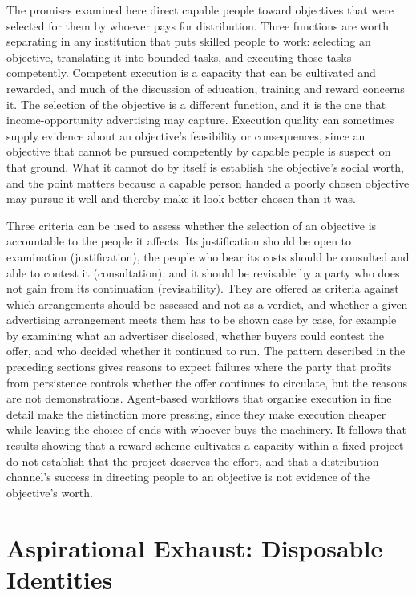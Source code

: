 \documentclass[12pt, a4paper]{article}
\begin{document}
The promises examined here direct capable people toward objectives that were selected for them by whoever pays for distribution. Three functions are worth separating in any institution that puts skilled people to work: selecting an objective, translating it into bounded tasks, and executing those tasks competently. Competent execution is a capacity that can be cultivated and rewarded, and much of the discussion of education, training and reward concerns it. The selection of the objective is a different function, and it is the one that income-opportunity advertising may capture. Execution quality can sometimes supply evidence about an objective's feasibility or consequences, since an objective that cannot be pursued competently by capable people is suspect on that ground. What it cannot do by itself is establish the objective's social worth, and the point matters because a capable person handed a poorly chosen objective may pursue it well and thereby make it look better chosen than it was.

Three criteria can be used to assess whether the selection of an objective is accountable to the people it affects. Its justification should be open to examination (justification), the people who bear its costs should be consulted and able to contest it (consultation), and it should be revisable by a party who does not gain from its continuation (revisability). They are offered as criteria against which arrangements should be assessed and not as a verdict, and whether a given advertising arrangement meets them has to be shown case by case, for example by examining what an advertiser disclosed, whether buyers could contest the offer, and who decided whether it continued to run. The pattern described in the preceding sections gives reasons to expect failures where the party that profits from persistence controls whether the offer continues to circulate, but the reasons are not demonstrations. Agent-based workflows that organise execution in fine detail make the distinction more pressing, since they make execution cheaper while leaving the choice of ends with whoever buys the machinery. It follows that results showing that a reward scheme cultivates a capacity within a fixed project do not establish that the project deserves the effort, and that a distribution channel's success in directing people to an objective is not evidence of the objective's worth.

\section{Aspirational Exhaust: Disposable Identities}
\label{sec:pages}
\end{document}
